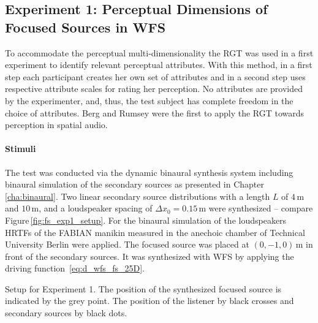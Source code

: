 \subsection[Perceptual Dimensions of Focused Sources]{Experiment 1: Perceptual
Dimensions of Focused Sources in
\ac{WFS}\autocite[This experiment was done in collaboration with Matthias Geier
and parts of this section are published in][]{Geier2010a}}
\label{sec:experiment1_perceptual_dimensions_of_focused_sources_in_wfs}

To accommodate the perceptual multi-dimensionality the \ac{RGT} was used in a first
experiment to identify relevant perceptual attributes.\autocite{Kelly1955}
With this method, in a first step each participant creates her own set of
attributes and in a second step uses respective attribute scales for rating
her perception. No attributes are provided by the experimenter, and, thus,
the test subject has complete freedom in the choice of attributes.
Berg and Rumsey were the first to apply the \ac{RGT} towards perception in
spatial audio.\autocite{Berg1999}


\paragraph{Stimuli}
The test was conducted via the dynamic binaural synthesis system including
binaural simulation of the secondary sources as presented in
Chapter\,\ref{cha:binaural}.
Two linear secondary source distributions with a length $L$ of $4$\,m
and $10$\,m, and a loudspeaker spacing of
$\Delta x_0 = 0.15$\,m were synthesized -- compare Figure\,\ref{fig:fs_exp1_setup}.
For the binaural simulation of the loudspeakers \acp{HRTF} of the {\small FABIAN}
manikin measured in the anechoic chamber of Technical
University Berlin were applied.
The focused source was placed at $(0,-1,0)$\,m in front of the secondary
sources. It was synthesized with \twohalfD \ac{WFS} by applying the driving
function~\ref{eq:d_wfs_fs_25D}.
%
\begin{marginfigure}
    \ft
    
    \caption{Setup for Experiment 1. The position of the synthesized focused
    source is indicated by the grey point. The position of the listener by black
    crosses and secondary sources by black dots.
        }
    \label{fig:fs_exp1_setup}
\end{marginfigure}
%

